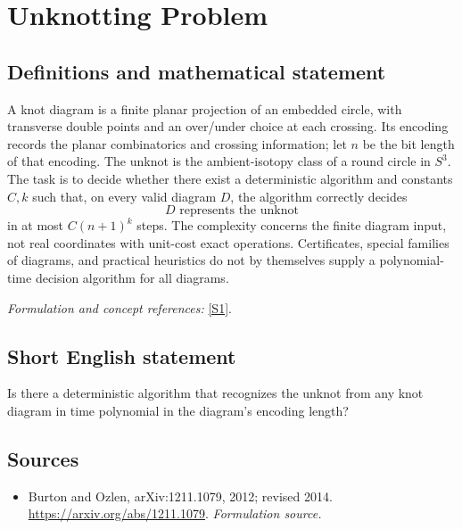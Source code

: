 \documentclass[11pt]{article}
\begin{document}
\section*{\texorpdfstring{Unknotting Problem}{Unknotting Problem}}\label{1331}
\subsection{Definitions and mathematical statement}
A knot diagram is a finite planar projection of an embedded circle, with transverse double points and an over/under choice at each crossing. Its encoding records the planar combinatorics and crossing information; let $n$ be the bit length of that encoding. The unknot is the ambient-isotopy class of a round circle in $S^3$. The task is to decide whether there exist a deterministic algorithm and constants $C,k$ such that, on every valid diagram $D$, the algorithm correctly decides
\[
 D\text{ represents the unknot}
\]
in at most $C(n+1)^k$ steps. The complexity concerns the finite diagram input, not real coordinates with unit-cost exact operations. Certificates, special families of diagrams, and practical heuristics do not by themselves supply a polynomial-time decision algorithm for all diagrams.
\par\smallskip\textit{Formulation and concept references:} \href{https://arxiv.org/abs/1211.1079}{[S1]}.

\subsection{Short English statement}
Is there a deterministic algorithm that recognizes the unknot from any knot diagram in time polynomial in the diagram's encoding length?
\subsection{Sources}
\begin{itemize}
\item[S1]Burton and Ozlen, arXiv:1211.1079, 2012; revised 2014.
\url{https://arxiv.org/abs/1211.1079}.
\textit{Formulation source.}
\end{itemize}
\end{document}
